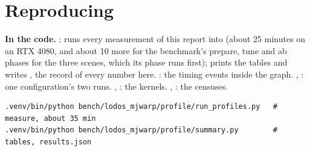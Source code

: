 \section{Reproducing}\label{sec:reproduce}

\begin{codebox}
\textbf{In the code.} :  runs every measurement of this report into  (about 25 minutes on an RTX 4080, and about 10 more for the benchmark's prepare, tune and ab phases for the three scenes, which its  phase runs first);  prints the tables and writes , the record of every number here. : the timing events inside the graph. , : one configuration's two runs. , : the kernels. , : the censuses.
\end{codebox}

\begin{lstlisting}
.venv/bin/python bench/lodos_mjwarp/profile/run_profiles.py   # measure, about 35 min
.venv/bin/python bench/lodos_mjwarp/profile/summary.py        # tables, results.json
\end{lstlisting}



